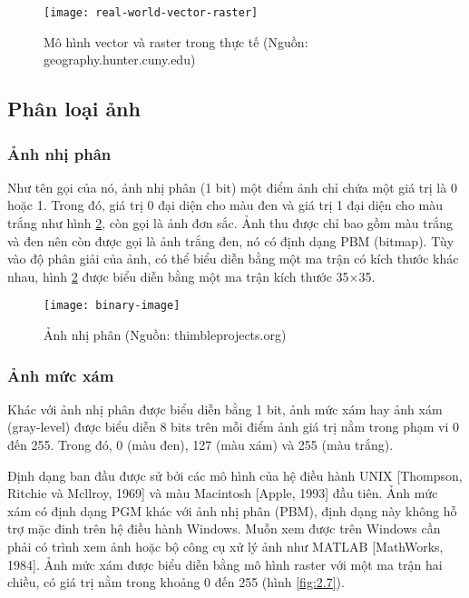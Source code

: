 \begin{figure}[h]
	\centering
	\texttt{[image: real-world-vector-raster]}
	\caption[Mô hình biểu diễn ảnh vector và raster trong thực tế]{Mô hình vector và raster trong thực tế (Nguồn: geography.hunter.cuny.edu)}
	\label{fig:2.5}
\end{figure}

\subsection{Phân loại ảnh}
\subsubsection{Ảnh nhị phân}
Như tên gọi của nó, ảnh nhị phân (1 bit) một điểm ảnh chỉ chứa một giá trị là 0 hoặc 1. Trong đó, giá trị 0 đại diện cho màu đen và giá trị 1 đại diện cho màu trắng như hình \ref{fig:2.6}, còn gọi là ảnh đơn sắc. Ảnh thu được chỉ bao gồm màu trắng và đen nên còn được gọi là ảnh trắng đen, nó có định dạng PBM (bitmap). Tùy vào độ phân giải của ảnh, có thể biểu diễn bằng một ma trận có kích thước khác nhau, hình \ref{fig:2.6} được biểu diễn bằng một ma trận kích thước 35$\times$35. \par

\begin{figure}[h]
	\centering
	\texttt{[image: binary-image]}
	\caption[Ảnh nhị phân]{Ảnh nhị phân (Nguồn: thimbleprojects.org)}
	\label{fig:2.6}
\end{figure}

\subsubsection{Ảnh mức xám}
Khác với ảnh nhị phân được biểu diễn bằng 1 bit, ảnh mức xám hay ảnh xám (gray-level) được biểu diễn 8 bits trên mỗi điểm ảnh giá trị nằm trong phạm vi 0 đến 255. Trong đó, 0 (màu đen), 127 (màu xám) và 255 (màu trắng). \par
Định dạng ban đầu được sử bởi các mô hình của hệ điều hành UNIX [Thompson, Ritchie và Mcllroy, 1969] và màu Macintosh [Apple, 1993] đầu tiên. Ảnh mức xám có định dạng PGM khác với ảnh nhị phân (PBM), định dạng này không hỗ trợ mặc đinh trên hệ điều hành Windows. Muỗn xem được trên Windows cần phải có trình xem ảnh hoặc bộ công cụ xử lý ảnh như MATLAB [MathWorks, 1984]. Ảnh mức xám được biểu diễn bằng mô hình raster với một ma trận hai chiều, có giá trị nằm trong khoảng 0 đến 255 (hình \ref{fig:2.7}).\par

